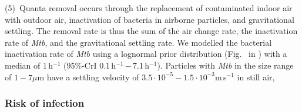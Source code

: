 \documentclass[fleqn,11pt]{wlscirep}
\begin{document}
(5)~Quanta removal occurs through the replacement of contaminated indoor air with outdoor air, inactivation of bacteria in airborne particles, and gravitational settling. The removal rate is thus the sum of the air change rate, the inactivation rate of \emph{Mtb}, and the gravitational settling rate. We modelled the bacterial inactivation rate of \emph{Mtb} using a lognormal prior distribution (Fig.~ in \supp) with a median of 1\,h$^{-1}$ (95\%-CrI 0.1\,h$^{-1}$\,$-$\,7.1\,h$^{-1}$)\cite{Loudon1969AMRRD,Lever2000LettersAppliedMicrobio,Gannon2007ResVetSci,Klein2014IJMyco}.  Particles with \emph{Mtb} in the size range of $1-7\mu$m\cite{Fennelly2020Lancet} have a settling velocity of  $3.5\cdot 10^{-5}-1.5\cdot 10^{-3}$m\,s$^{-1}$ in still air\cite{Vuorinen2020SafSci}, 

\subsubsection*{Risk of infection}
\end{document}

